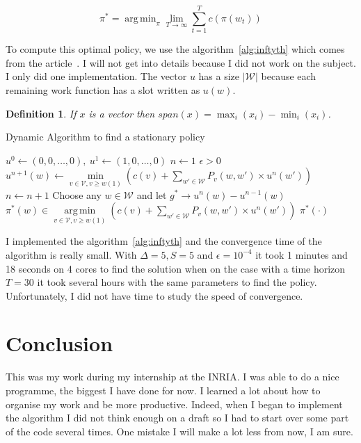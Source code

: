 \documentclass[
10pt, %
a4paper, %
oneside, %
headinclude,footinclude, %
BCOR5mm, %
]{scrartcl}
\DeclareMathOperator*{\argmin}{arg\,min}
\newcommand{\V}{\mathcal{V}}
\newcommand{\W}{\mathcal{W}}
\newtheorem{defi}{Definition}
\begin{document}
\begin{equation}
  \label{eq:optpol}
  \pi^*=\argmin_{\pi} \lim\limits_{T\rightarrow\infty}\sum\limits_{t=1}^Tc(\pi(w_t))
\end{equation}

To compute this optimal policy, we use the
algorithm~\ref{alg:inftyth} which comes from the article~\cite{Gaujal}.
I will not get into details because I did
not work on the subject. I only did one implementation. The vector $u$
has a size $|\W|$ because each remaining work function has a slot
written as $u(w)$.\\
\begin{defi}
  If $x$ is a vector then $span(x)=\max_i(x_i)-\min_i(x_i)$\cite{Gaujal}.\\
\end{defi}

\begin{algorithm}
  \caption{Dynamic Algorithm to find a stationary policy}
  \label{alg:inftyth}  
  \begin{algorithmic}
    \STATE $u^0\leftarrow (0,0,\dots,0),~u^1\leftarrow(1,0,\dots,0)$
    \STATE $n\leftarrow1$
    \STATE $\epsilon>0$
    \FORALL{$w\in\W$}
    \STATE $u^{n+1}(w)\leftarrow\min\limits_{v\in\V,v\geq
      w(1)}\left(c(v)+\sum\limits_{w'\in\W}P_v(w,w')\times u^n(w')\right)$
    \ENDFOR
    \STATE $n\leftarrow n+1$
    \ENDWHILE
    \STATE Choose any $w\in\W$ and let $g^*\rightarrow
    u^n(w)-u^{n-1}(w)$
    \FORALL{$w\in\W$}
    \STATE
    $\pi^*(w)\in\argmin\limits_{v\in\V,v\geq
      w(1)}\left(c(v)+\sum\limits_{w'\in\W}P_v(w,w')\times
      u^n(w')\right)$
    \ENDFOR
    \RETURN $\pi^*(\cdot)$
  \end{algorithmic}
\end{algorithm}

I implemented the algorithm~\ref{alg:inftyth} and the
convergence time of the algorithm is really small. With
$\Delta=5,S=5$ and $\epsilon=10^{-4}$ it took 1 minutes and 18 seconds
on 4 cores to find the solution when on the case with a time horizon
$T=30$ it took several hours with the same parameters to find the
policy. Unfortunately, I did not have time to study the speed of convergence.


\newpage

\section{Conclusion}
This was my work during my internship at the INRIA. I was able to do
a  nice programme, the biggest I have done for now.
I learned a lot about how to organise my work and be more
productive. Indeed, when I began to implement the algorithm I did not
think enough on a draft so I had to start over some part of the code
several times. One mistake I will make a lot less from now, I am sure.\\
\end{document}
